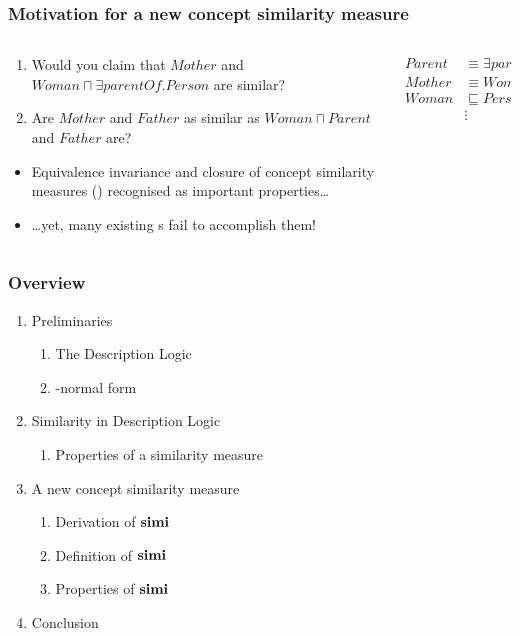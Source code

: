 \documentclass{beamer}
\begin{document}
\begin{frame}
  \frametitle{Motivation for a new concept similarity measure}
  
  \begin{columns}
    \begin{column}{0.61\textwidth}
      \begin{enumerate}[<+->]
        \item Would you claim that \(Mother\) and
        \(Woman \sqcap \exists{}parentOf.Person\) are similar?
        \item Are \(Mother\) and \(Father\) as similar
        as \(Woman \sqcap Parent\) and \(Father\) are?
      \end{enumerate}
      \begin{itemize}[<+->]
        \item Equivalence \alert{invariance} and \alert{closure}
        of concept similarity measures (\csm)
        recognised as important properties\ldots
        \item \ldots yet, many existing
        \csm{}s fail to accomplish them!
      \end{itemize}
    \end{column}
    \begin{column}{0.39\textwidth}
      \begin{align*}
        Parent &\equiv \exists{}parentOf.Person \\
        Mother &\equiv Woman \sqcap Parent \\
        Woman &\sqsubseteq Person \\
        &\vdots         
      \end{align*}
    \end{column}
  \end{columns}
\end{frame}

\begin{frame}
  \frametitle{Overview}
  \begin{enumerate}
    \item Preliminaries
    \begin{enumerate}
      \item The \elh Description Logic
      \item \elh-normal form
    \end{enumerate}
    \item Similarity in Description Logic
    \begin{enumerate}
      \item Properties of a similarity measure
    \end{enumerate}
    \item A new concept similarity measure
    \begin{enumerate}
      \item Derivation of \(\operatorname{\mathbf{simi}}\)
      \item Definition of \(\operatorname{\mathbf{simi}}\)
      \item Properties of \(\operatorname{\mathbf{simi}}\)
    \end{enumerate}
    \item Conclusion
  \end{enumerate}
\end{frame}
\end{document}

